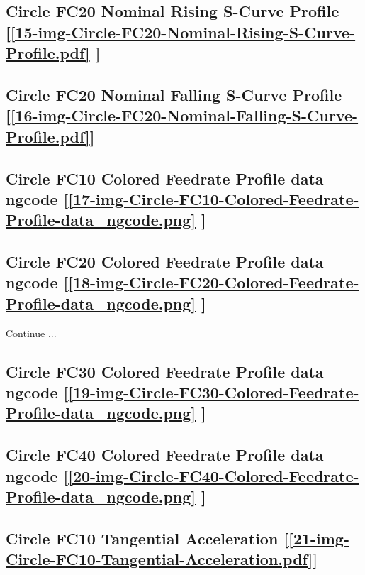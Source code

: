 \subsection     {Circle FC20 Nominal Rising S-Curve Profile
[\ref      {15-img-Circle-FC20-Nominal-Rising-S-Curve-Profile.pdf} ] }
\label{ssec-15-img-Circle-FC20-Nominal-Rising-S-Curve-Profile.pdf}

\subsection     {Circle FC20 Nominal Falling S-Curve Profile
[\ref      {16-img-Circle-FC20-Nominal-Falling-S-Curve-Profile.pdf}] }
\label{ssec-16-img-Circle-FC20-Nominal-Falling-S-Curve-Profile.pdf}

\subsection       {Circle FC10 Colored Feedrate Profile data ngcode
[\ref      {17-img-Circle-FC10-Colored-Feedrate-Profile-data_ngcode.png} ] }
\label{ssec-17-img-Circle-FC10-Colored-Feedrate-Profile-data_ngcode.png}

\subsection       {Circle FC20 Colored Feedrate Profile data ngcode
[\ref      {18-img-Circle-FC20-Colored-Feedrate-Profile-data_ngcode.png} ] }
\label{ssec-18-img-Circle-FC20-Colored-Feedrate-Profile-data_ngcode.png}

Continue ...\\

\subsection       {Circle FC30 Colored Feedrate Profile data ngcode
[\ref      {19-img-Circle-FC30-Colored-Feedrate-Profile-data_ngcode.png} ] }
\label{ssec-19-img-Circle-FC30-Colored-Feedrate-Profile-data_ngcode.png}

\subsection       {Circle FC40 Colored Feedrate Profile data ngcode
[\ref      {20-img-Circle-FC40-Colored-Feedrate-Profile-data_ngcode.png} ] }
\label{ssec-20-img-Circle-FC40-Colored-Feedrate-Profile-data_ngcode.png}

\subsection       {Circle FC10 Tangential Acceleration
[\ref      {21-img-Circle-FC10-Tangential-Acceleration.pdf}] }
\label{ssec-21-img-Circle-FC10-Tangential-Acceleration.pdf}

